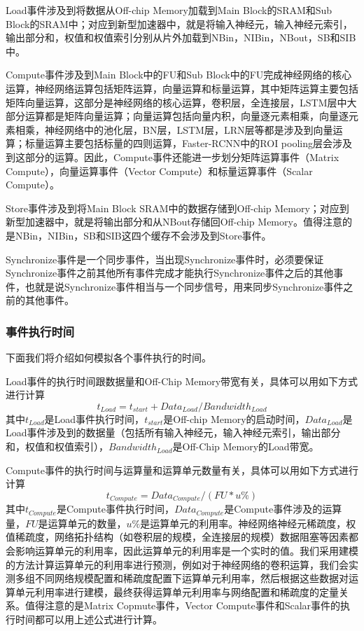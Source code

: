 Load事件涉及到将数据从Off-chip Memory加载到Main Block的SRAM和Sub Block的SRAM中；对应到新型加速器中，就是将输入神经元，输入神经元索引，输出部分和，权值和权值索引分别从片外加载到NBin，NIBin，NBout，SB和SIB中。

Compute事件涉及到Main Block中的FU和Sub Block中的FU完成神经网络的核心运算，神经网络运算包括矩阵运算，向量运算和标量运算，其中矩阵运算主要包括矩阵向量运算，这部分是神经网络的核心运算，卷积层，全连接层，LSTM层中大部分运算都是矩阵向量运算；向量运算包括向量内积，向量逐元素相乘，向量逐元素相乘，神经网络中的池化层，BN层，LSTM层，LRN层等都是涉及到向量运算；标量运算主要包括标量的四则运算，Faster-RCNN中的ROI pooling层会涉及到这部分的运算。因此，Compute事件还能进一步划分矩阵运算事件（Matrix Compute），向量运算事件（Vector Compute）和标量运算事件（Scalar Compute）。

Store事件涉及到将Main Block SRAM中的数据存储到Off-chip Memory；对应到新型加速器中，就是将输出部分和从NBout存储回Off-chip Memory。值得注意的是NBin，NIBin，SB和SIB这四个缓存不会涉及到Store事件。

Synchronize事件是一个同步事件，当出现Synchronize事件时，必须要保证Synchronize事件之前其他所有事件完成才能执行Synchronize事件之后的其他事件，也就是说Synchronize事件相当与一个同步信号，用来同步Synchronize事件之前的其他事件。

\subsubsection{事件执行时间}
下面我们将介绍如何模拟各个事件执行的时间。

Load事件的执行时间跟数据量和Off-Chip Memory带宽有关，具体可以用如下方式进行计算
\begin{equation}
t_{Load} = t_{start} + Data_{Load} / Bandwidth_{Load}
\end{equation}
其中$t_{Load}$是Load事件执行时间，$t_{start}$是Off-chip Memory的启动时间，$Data_{Load}$是Load事件涉及到的数据量（包括所有输入神经元，输入神经元索引，输出部分和，权值和权值索引），$Bandwidth_{Load}$是Off-Chip Memory的Load带宽。

Compute事件的执行时间与运算量和运算单元数量有关，具体可以用如下方式进行计算
\begin{equation}
t_{Compute} = Data_{Compute} / (FU * u\%)
\end{equation}
其中$t_{Compute}$是Compute事件执行时间，$Data_{Compute}$是Compute事件涉及的运算量，$FU$是运算单元的数量，$u\%$是运算单元的利用率。神经网络神经元稀疏度，权值稀疏度，网络拓扑结构（如卷积层的规模，全连接层的规模）数据阻塞等因素都会影响运算单元的利用率，因此运算单元的利用率是一个实时的值。我们采用建模的方法计算运算单元的利用率进行预测，例如对于神经网络的卷积运算，我们会实测多组不同网络规模配置和稀疏度配置下运算单元利用率，然后根据这些数据对运算单元利用率进行建模，最终获得运算单元利用率与网络配置和稀疏度的定量关系。值得注意的是Matrix Copmute事件，Vector Compute事件和Scalar事件的执行时间都可以用上述公式进行计算。

